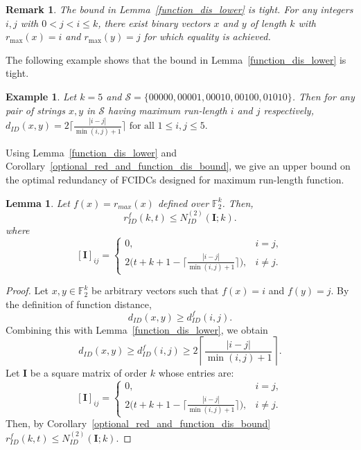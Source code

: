 \documentclass[11 pt]{article}
\numberwithin{equation}{section}
\newtheorem{lemma}[theorem]{Lemma}
\newtheorem{example}[theorem]{Example}
\newtheorem{remark}[theorem]{Remark}
\begin{document}
    \begin{remark}
        The bound in Lemma~\ref{function_dis_lower} is tight. For any integers $i, j$ with $0 < j < i \leq k$, there exist binary vectors $x$ and $y$ of length $k$ with $r_{\max}(x) = i$ and $r_{\max}(y) = j$ for which equality is achieved.
    \end{remark}
    \noindent The following example shows that the bound in Lemma~\ref{function_dis_lower} is tight.
    
    \begin{example}
        Let $k = 5$ and $\mathcal{S}= \{00000, 00001, 00010, 00100, 01010\}$. Then for any pair of strings $x,y$ in $\mathcal{S}$ having maximum run-length $i$ and $j$ respectively, $d_{ID}(x, y) = 2\Big \lceil \frac{|i-j|}{\min(i,j)+1} \Big \rceil \text{ for all } 1 \leq i,j \leq 5.$ 
    \end{example}
    
    \noindent Using Lemma~\ref{function_dis_lower} and Corollary~\ref{optional_red_and_function_dis_bound}, we give an upper bound on the optimal redundancy of FCIDCs designed for maximum run-length function.
    
    \begin{lemma}\label{max_runs_upper_bound}
        Let $f(x) = r_{max}(x)$ defined over $\mathbb{F}_2^k$. Then, 
        \[
            r_{ID}^f(k,t) \leq N_{ID}^{(2)}(\bm{I};k).
        \]
        where 
        \[
            [\boldsymbol{I}]_{ij} = 
            \begin{cases}
                0,      & i = j, \\[4pt]
                2\Big (t + k + 1 - \Big \lceil \frac{|i-j|}{\min(i,j) +1} \Big \rceil \Big ) , & i \neq j.                
            \end{cases}
        \]
    \end{lemma} 
    \begin{proof}
        Let $x,y \in \mathbb F_2^k$ be arbitrary vectors such that $f(x)=i$ and $f(y)=j$. By the definition of function distance,
    \[
    d_{ID}(x,y)\ge d^f_{ID}(i,j).
    \]
    Combining this with Lemma~\ref{function_dis_lower}, we obtain
    \[
    d_{ID}(x,y)\ge d^f_{ID}(i,j)
    \ge
    2\left\lceil
    \frac{|i-j|}{\min(i,j)+1}
    \right\rceil.
    \] 
    Let $\boldsymbol{I}$ be a square matrix of order $k$ whose entries are:
        \[
            [\boldsymbol{I}]_{ij} = 
            \begin{cases}
                0,      & i = j, \\[4pt]
                2\Big (t + k + 1 - \Big \lceil \frac{|i-j|}{\min(i,j) +1} \Big \rceil \Big ) , & i \neq j.               
            \end{cases}
        \]
        Then, by Corollary~\ref{optional_red_and_function_dis_bound} $r_{ID}^f(k,t) \leq N_{ID}^{(2)}(\bm{I};k).$       
    \end{proof}
\end{document}
